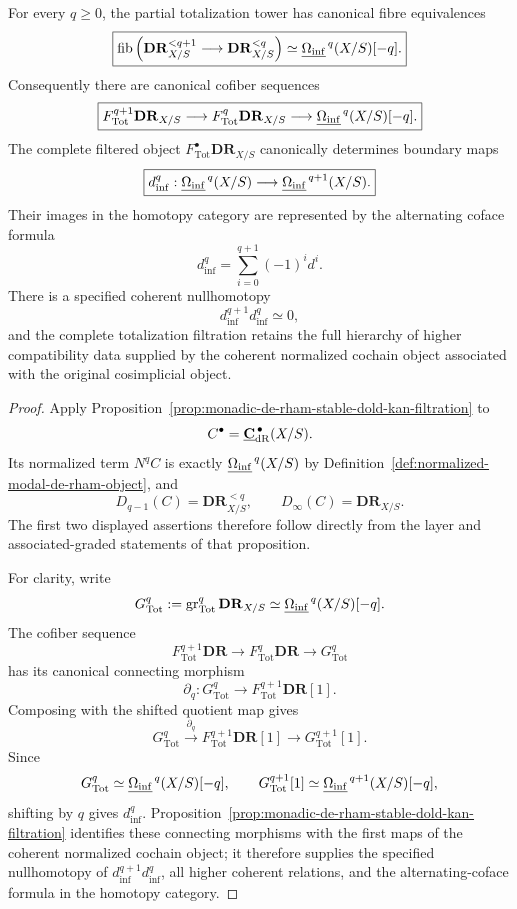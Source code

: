 \begin{theorem}
\label{thm:monadic-de-rham-dold-kan}
For every \(q\geq0\), the partial totalization tower has canonical fibre equivalences
\[
\boxed{
    \operatorname{fib}
    \left(
        \mathbf{DR}_{X/S}^{<q+1}
        \longrightarrow
        \mathbf{DR}_{X/S}^{<q}
    \right)
    \simeq
    \underline{\Omega_{\mathrm{inf}}}^{\,q}(X/S)[-q].
}
\]
Consequently there are canonical cofiber sequences
\[
\boxed{
    F_{\mathrm{Tot}}^{q+1}\mathbf{DR}_{X/S}
    \longrightarrow
    F_{\mathrm{Tot}}^q\mathbf{DR}_{X/S}
    \longrightarrow
    \underline{\Omega_{\mathrm{inf}}}^{\,q}(X/S)[-q].
}
\]
The complete filtered object \(F_{\mathrm{Tot}}^\bullet\mathbf{DR}_{X/S}\) canonically determines boundary maps
\[
\boxed{
    d_{\inf}^q:
    \underline{\Omega_{\mathrm{inf}}}^{\,q}(X/S)
    \longrightarrow
    \underline{\Omega_{\mathrm{inf}}}^{\,q+1}(X/S).
}
\]
Their images in the homotopy category are represented by the alternating coface formula
\[
\boxed{
    d_{\inf}^q
    =
    \sum_{i=0}^{q+1}(-1)^id^i.
}
\]
There is a specified coherent nullhomotopy
\[
    d_{\inf}^{q+1}d_{\inf}^{q}\simeq0,
\]
and the complete totalization filtration retains the full hierarchy of higher compatibility data
supplied by the coherent normalized cochain object associated with the original cosimplicial object.
\end{theorem}

\begin{proof}
Apply Proposition~\ref{prop:monadic-de-rham-stable-dold-kan-filtration} to
\[
    C^\bullet
    =
    \underline{\mathbf C}_{\mathrm{dR}}^{\,\bullet}(X/S).
\]
Its normalized term \(N^qC\) is exactly \(\underline{\Omega_{\mathrm{inf}}}^{\,q}(X/S)\) by
Definition~\ref{def:normalized-modal-de-rham-object}, and
\[
    D_{q-1}(C)=\mathbf{DR}_{X/S}^{<q},
    \qquad
    D_\infty(C)=\mathbf{DR}_{X/S}.
\]
The first two displayed assertions therefore follow directly from the layer and associated-graded
statements of that proposition.

For clarity, write
\[
    G_{\mathrm{Tot}}^q
    :=
    \operatorname{gr}_{\mathrm{Tot}}^q\mathbf{DR}_{X/S}
    \simeq
    \underline{\Omega_{\mathrm{inf}}}^{\,q}(X/S)[-q].
\]
The cofiber sequence
\[
    F_{\mathrm{Tot}}^{q+1}\mathbf{DR}
    \longrightarrow
    F_{\mathrm{Tot}}^q\mathbf{DR}
    \longrightarrow
    G_{\mathrm{Tot}}^q
\]
has its canonical connecting morphism
\[
    \partial_q:G_{\mathrm{Tot}}^q\longrightarrow F_{\mathrm{Tot}}^{q+1}\mathbf{DR}[1].
\]
Composing with the shifted quotient map gives
\[
    G_{\mathrm{Tot}}^q
    \xrightarrow{\partial_q}
    F_{\mathrm{Tot}}^{q+1}\mathbf{DR}[1]
    \longrightarrow
    G_{\mathrm{Tot}}^{q+1}[1].
\]
Since
\[
    G_{\mathrm{Tot}}^q\simeq\underline{\Omega_{\mathrm{inf}}}^{\,q}(X/S)[-q],
    \qquad
    G_{\mathrm{Tot}}^{q+1}[1]\simeq\underline{\Omega_{\mathrm{inf}}}^{\,q+1}(X/S)[-q],
\]
shifting by \(q\) gives \(d_{\inf}^q\).  Proposition~\ref{prop:monadic-de-rham-stable-dold-kan-filtration}
identifies these connecting morphisms with the first maps of the coherent normalized cochain object;
it therefore supplies the specified nullhomotopy of \(d_{\inf}^{q+1}d_{\inf}^q\), all higher coherent
relations, and the alternating-coface formula in the homotopy category.
\end{proof}

